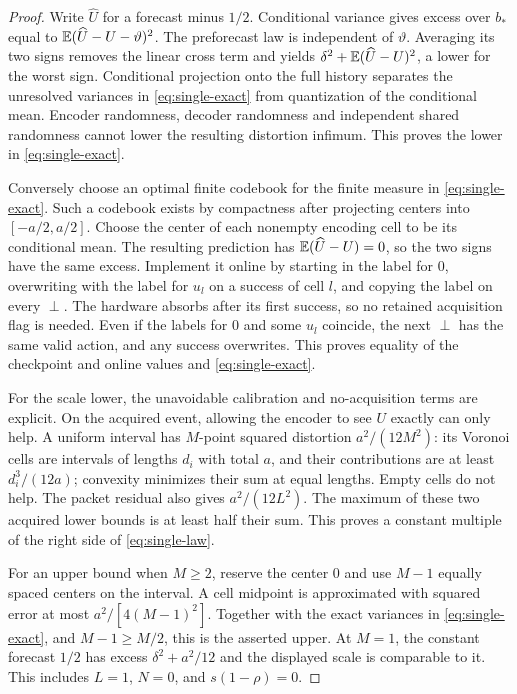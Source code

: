 \begin{proof}
Write $\widehat U$ for a forecast minus $1/2$. Conditional variance gives excess over $b_*$ equal to $\mathbb E(\widehat U-U-\vartheta)^2$. The preforecast law is independent of $\vartheta$. Averaging its two signs removes the linear cross term and yields
$\delta^2+\mathbb E(\widehat U-U)^2$, a lower for the worst sign. Conditional projection onto the full history separates the unresolved variances in \eqref{eq:single-exact} from quantization of the conditional mean. Encoder randomness, decoder randomness and independent shared randomness cannot lower the resulting distortion infimum. This proves the lower in \eqref{eq:single-exact}.

Conversely choose an optimal finite codebook for the finite measure in \eqref{eq:single-exact}. Such a codebook exists by compactness after projecting centers into $[-a/2,a/2]$. Choose the center of each nonempty encoding cell to be its conditional mean. The resulting prediction has $\mathbb E(\widehat U-U)=0$, so the two signs have the same excess. Implement it online by starting in the label for $0$, overwriting with the label for $u_l$ on a success of cell $l$, and copying the label on every $\perp$. The hardware absorbs after its first success, so no retained acquisition flag is needed. Even if the labels for $0$ and some $u_l$ coincide, the next $\perp$ has the same valid action, and any success overwrites. This proves equality of the checkpoint and online values and \eqref{eq:single-exact}.

For the scale lower, the unavoidable calibration and no-acquisition terms are explicit. On the acquired event, allowing the encoder to see $U$ exactly can only help. A uniform interval has $M$-point squared distortion $a^2/(12M^2)$: its Voronoi cells are intervals of lengths $d_i$ with total $a$, and their contributions are at least $d_i^3/(12a)$; convexity minimizes their sum at equal lengths. Empty cells do not help. The packet residual also gives $a^2/(12L^2)$. The maximum of these two acquired lower bounds is at least half their sum. This proves a constant multiple of the right side of \eqref{eq:single-law}.

For an upper bound when $M\ge2$, reserve the center $0$ and use $M-1$ equally spaced centers on the interval. A cell midpoint is approximated with squared error at most $a^2/[4(M-1)^2]$. Together with the exact variances in \eqref{eq:single-exact}, and $M-1\ge M/2$, this is the asserted upper. At $M=1$, the constant forecast $1/2$ has excess $\delta^2+a^2/12$ and the displayed scale is comparable to it. This includes $L=1$, $N=0$, and $s(1-\rho)=0$.
\end{proof}


